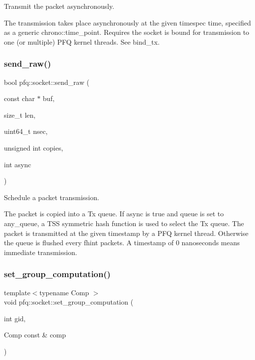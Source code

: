 Transmit the packet asynchronously.

The transmission takes place asynchronously at the given timespec time, specified as a generic chrono\+::time\+\_\+point. Requires the socket is bound for transmission to one (or multiple) P\+FQ kernel threads. See \textquotesingle{}bind\+\_\+tx\textquotesingle{}. \mbox{\label{classpfq_1_1socket_a32bc4849b022ac9c0e8b3a7d44985bc2}} 
\subsubsection{\texorpdfstring{send\+\_\+raw()}{send\_raw()}}
{\footnotesize\ttfamily bool pfq\+::socket\+::send\+\_\+raw (\begin{DoxyParamCaption}\item[{const char $\ast$}]{buf,  }\item[{size\+\_\+t}]{len,  }\item[{uint64\+\_\+t}]{nsec,  }\item[{unsigned int}]{copies,  }\item[{int}]{async }\end{DoxyParamCaption})\hspace{0.3cm}{\ttfamily [inline]}}



Schedule a packet transmission. 

The packet is copied into a Tx queue. If \textquotesingle{}async\textquotesingle{} is true and \textquotesingle{}queue\textquotesingle{} is set to any\+\_\+queue, a T\+SS symmetric hash function is used to select the Tx queue. The packet is transmitted at the given timestamp by a P\+FQ kernel thread. Otherwise the queue is flushed every \textquotesingle{}fhint\textquotesingle{} packets. A timestamp of 0 nanoseconds means immediate transmission. \mbox{\label{classpfq_1_1socket_a5cb37765ffcb1b78c5d61211f9e806df}} 
\subsubsection{\texorpdfstring{set\+\_\+group\+\_\+computation()}{set\_group\_computation()}\hspace{0.1cm}{\footnotesize\ttfamily [1/4]}}
{\footnotesize\ttfamily template$<$typename Comp $>$ \\
void pfq\+::socket\+::set\+\_\+group\+\_\+computation (\begin{DoxyParamCaption}\item[{int}]{gid,  }\item[{Comp const \&}]{comp }\end{DoxyParamCaption})\hspace{0.3cm}{\ttfamily [inline]}}



